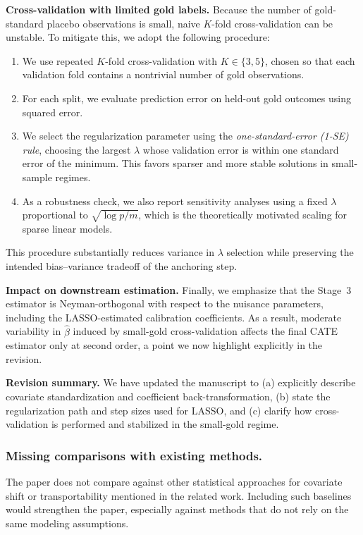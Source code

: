 {\medskip
\noindent
\textbf{Cross-validation with limited gold labels.}
Because the number of gold-standard placebo observations is small, naive $K$-fold cross-validation can be unstable. To mitigate this, we adopt the following procedure:
\begin{enumerate}
\item We use repeated $K$-fold cross-validation with $K\in\{3,5\}$, chosen so that each validation fold contains a nontrivial number of gold observations.
\item For each split, we evaluate prediction error on held-out gold outcomes using squared error.
\item We select the regularization parameter using the \emph{one-standard-error (1-SE) rule}, choosing the largest $\lambda$ whose validation error is within one standard error of the minimum. This favors sparser and more stable solutions in small-sample regimes.
\item As a robustness check, we also report sensitivity analyses using a fixed $\lambda$ proportional to $\sqrt{\log p / m}$, which is the theoretically motivated scaling for sparse linear models.
\end{enumerate}
This procedure substantially reduces variance in $\lambda$ selection while preserving the intended bias--variance tradeoff of the anchoring step.

\medskip
\noindent
\textbf{Impact on downstream estimation.}
Finally, we emphasize that the Stage~3 estimator is Neyman-orthogonal with respect to the nuisance parameters, including the LASSO-estimated calibration coefficients. As a result, moderate variability in $\hat\beta$ induced by small-gold cross-validation affects the final CATE estimator only at second order, a point we now highlight explicitly in the revision.

\medskip
\noindent
\textbf{Revision summary.}
We have updated the manuscript to (a) explicitly describe covariate standardization and coefficient back-transformation, (b) state the regularization path and step sizes used for LASSO, and (c) clarify how cross-validation is performed and stabilized in the small-gold regime.
}


\subsubsection{Missing comparisons with existing methods.}  
The paper does not compare against other statistical approaches for covariate shift or transportability mentioned in the related work. Including such baselines would strengthen the paper, especially against methods that do not rely on the same modeling assumptions.

